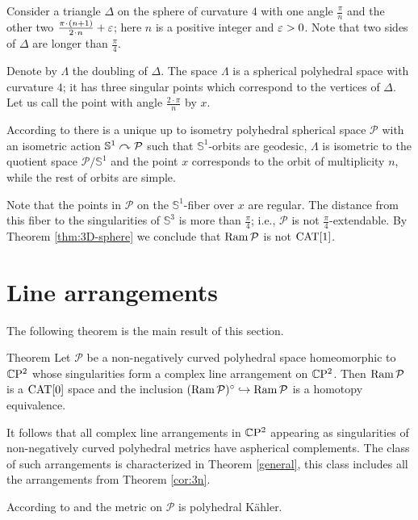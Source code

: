 \documentclass[oneside,a4paper]{article}
\def\Ram{\mathop{\rm Ram}\nolimits}
\def\SS{\mathbb{S}}
\begin{document}
 Consider a triangle $\Delta$ on the sphere of curvature $4$ with one angle $\frac{\pi}{n}$ and the other two $\frac{\pi\cdot(n+1)}{2\cdot n}\z+\varepsilon$;
here $n$ is a positive integer and $\varepsilon>0$.
Note that two sides of $\Delta$
are longer than $\frac{\pi}{4}$.

Denote by $\Lambda$ the doubling of $\Delta$.
The space $\Lambda$ is a spherical polyhedral space with curvature $4$;
it has three singular points which correspond to the vertices of $\Delta$.
Let us call the point with angle $\frac{2\cdot\pi}{n}$ by $x$.

According to \cite[Theorem 1.8]{panov} there is a unique up to isometry
polyhedral spherical space $\mathcal{P}$
with an isometric action $\SS^1\acts\mathcal{P}$
such that $\SS^1$-orbits are geodesic,
$\Lambda$ is isometric to the quotient space $\mathcal{P}/\SS^1$
and the point $x$ corresponds to the orbit of multiplicity $n$,
while the rest of orbits are simple.

Note that the points in $\mathcal{P}$ 
on the $\SS^1$-fiber over $x$ are regular.
The distance from this fiber to the singularities of
$\SS^3$ is more than $\frac{\pi}{4}$;
i.e., $\mathcal{P}$ is not $\frac{\pi}{4}$-extendable.
By Theorem \ref{thm:3D-sphere} we conclude that $\Ram \mathcal{P}$ is not $\mathrm{CAT}[1]$.
\qeds



\section{Line arrangements}\label{sec:linearrangement}

The following theorem is the main result of this section.

\begin{thm}{Theorem}\label{linearrangement} Let $\mathcal{P}$ be a non-negatively curved polyhedral space homeomorphic to $\mathbb{C}\mathrm{P}^2$ whose singularities form a complex line arrangement on $\mathbb{C}\mathrm{P}^2$.
Then $\Ram \mathcal{P}$ is a $\mathrm{CAT}[0]$ space and the inclusion $(\Ram \mathcal{P})^\circ\hookrightarrow\Ram \mathcal{P}$ is a homotopy equivalence.
\end{thm}

It follows that all complex line arrangements in $\mathbb{C}\mathrm{P}^2$
appearing as singularities of non-negatively curved polyhedral metrics
have aspherical complements. The class of such arrangements is characterized in
Theorem \ref{general},
this class includes all the arrangements from Theorem \ref{cor:3n}.

According to \cite{cheeger}
and \cite{panov}
the metric on $\mathcal{P}$ is
polyhedral K\"ahler.
\end{document}
